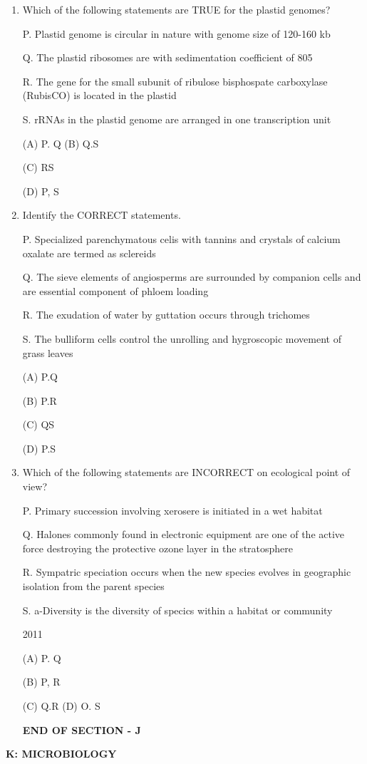 \documentclass[journal]{IEEEtran}
\begin{document}
\begin{enumerate}
{(A) O. R

(B) P, Q

(C) R.S

(D) P. S
}
\item{ Which of the following statements are TRUE for the plastid genomes?

P. Plastid genome is circular in nature with genome size of 120-160 kb

Q. The plastid ribosomes are with sedimentation coefficient of 805

R. The gene for the small subunit of ribulose bisphospate carboxylase (RubisCO) is located in the plastid

S. rRNAs in the plastid genome are arranged in one transcription unit

(A) P. Q
(B) Q.S

(C) RS

(D) P, S
}
\item {Identify the CORRECT statements.


P. Specialized parenchymatous celis with tannins and crystals of calcium oxalate are termed as sclereids

Q. The sieve elements of angiosperms are surrounded by companion cells and are essential component of phloem loading

R. The exudation of water by guttation occurs through trichomes

S. The bulliform cells control the unrolling and hygroscopic movement of grass leaves

(A) P.Q

(B) P.R

(C) QS

(D) P.S
}
\item {Which of the following statements are INCORRECT on ecological point of view?

P. Primary succession involving xerosere is initiated in a wet habitat

Q. Halones commonly found in electronic equipment are one of the active force destroying the protective ozone layer in the stratosphere

R. Sympatric speciation occurs when the new species evolves in geographic isolation from the parent species

S. a-Diversity is the diversity of specics within a habitat or community

2011

(A) P. Q

(B) P, R

(C) Q.R
(D) O. S
}
\newline\textbf{END OF SECTION - J}
\end{enumerate}
\newpage
\textbf{K: MICROBIOLOGY}
\end{document}
